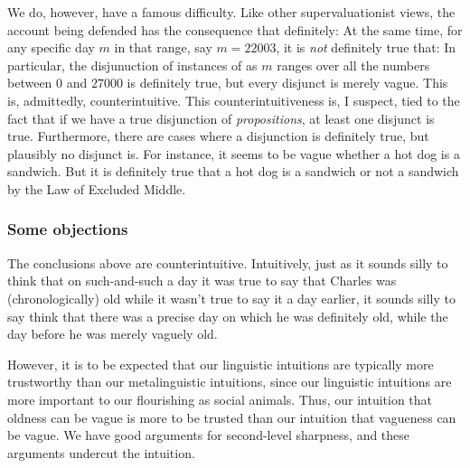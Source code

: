 We do, however, have a famous difficulty. Like other supervaluationist views, the account being
defended has the consequence that definitely:
At the same time, for any specific day $m$ in that range, say $m=22003$, it is \textit{not} definitely true that:
In particular, the disjunuction of instances of  as $m$ ranges over all the numbers between $0$ and $27000$
is definitely true, but every disjunct is merely vague. This is, admittedly, counterintuitive. This counterintuitiveness
is, I suspect, tied to the fact that if we have a true disjunction of \textit{propositions}, at least one disjunct 
is true.  Furthermore, there are cases where a disjunction is definitely true, but plausibly no disjunct is. For instance,
it seems to be vague whether a hot dog is a sandwich. But it is definitely true that a hot dog is a sandwich or
not a sandwich by the Law of Excluded Middle.

\subsubsection{Some objections}
The conclusions above are counterintuitive. Intuitively, just as it sounds silly to think that on such-and-such a day it was true
to say that Charles was (chronologically) old while it wasn't true to say it a day earlier, it sounds silly to say think
that there was a precise day on which he was definitely old, while the day before he was merely vaguely old.

However, it is to be expected that our linguistic intuitions are typically more trustworthy than our metalinguistic intuitions,
since our linguistic intuitions are more important to our flourishing as social animals. Thus, our intuition that oldness 
can be vague is more to be trusted than our intuition that vagueness can be vague. We have good arguments for second-level sharpness, and
these arguments undercut the intuition.

